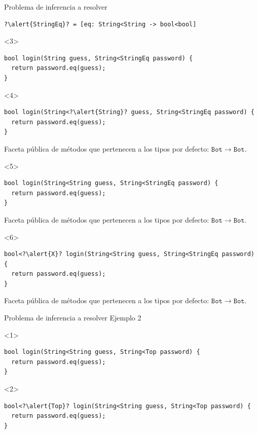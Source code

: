 \documentclass[aspectratio=169,18pt]{beamer}
\begin{document}
\begin{frame}[fragile]{Problema de inferencia a resolver}
\begin{onlyenv}
\begin{lstlisting}[escapechar=?,basicstyle=\fontsize{10}{10}\ttfamily]
?\alert{StringEq}? = [eq: String<String -> bool<bool]
\end{lstlisting}
	\end{onlyenv}
	\begin{onlyenv}
	\begin{lstlisting}[escapechar=?,basicstyle=\fontsize{10}{10}\ttfamily]
bool login(String guess, String<StringEq password) {
  return password.eq(guess);
}
\end{lstlisting}
		\end{onlyenv}
\begin{onlyenv}<4>
\begin{lstlisting}[escapechar=?,basicstyle=\fontsize{10}{10}\ttfamily]
bool login(String<?\alert{String}? guess, String<StringEq password) {
  return password.eq(guess);
}
\end{lstlisting}
Faceta pública de métodos que pertenecen a los tipos por defecto: $\mathtt{Bot\rightarrow Bot}$.
	\end{onlyenv}
	\begin{onlyenv}
\begin{lstlisting}[escapechar=?,basicstyle=\fontsize{10}{10}\ttfamily]
bool login(String<String guess, String<StringEq password) {
  return password.eq(guess);
}
\end{lstlisting}
Faceta pública de métodos que pertenecen a los tipos por defecto: $\mathtt{Bot\rightarrow Bot}$.
	\end{onlyenv}
	\begin{onlyenv}
\begin{lstlisting}[escapechar=?,basicstyle=\fontsize{10}{10}\ttfamily]
bool<?\alert{X}? login(String<String guess, String<StringEq password) {
  return password.eq(guess);
}
\end{lstlisting}
Faceta pública de métodos que pertenecen a los tipos por defecto: $\mathtt{Bot\rightarrow Bot}$.
	\end{onlyenv}
\end{frame}

\begin{frame}[fragile]{Problema de inferencia a resolver}
	Ejemplo 2 \\
	\vspace{1cm}
	\begin{onlyenv}
\begin{lstlisting}[basicstyle=\fontsize{10}{10}\ttfamily]
bool login(String<String guess, String<Top password) {
  return password.eq(guess);
}
\end{lstlisting}
	\end{onlyenv}
	\begin{onlyenv}
\begin{lstlisting}[escapechar=?,basicstyle=\fontsize{10}{10}\ttfamily]
bool<?\alert{Top}? login(String<String guess, String<Top password) {
  return password.eq(guess);
}
\end{lstlisting}
	\end{onlyenv}
\end{frame}
\end{document}
